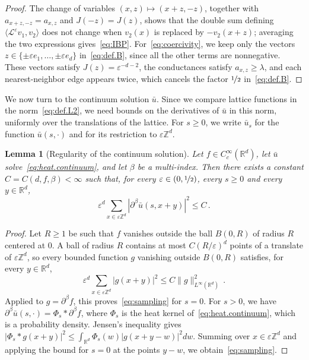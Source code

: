 \documentclass[11pt]{amsart}
\newtheorem{lemma}[theorem]{Lemma}
\numberwithin{equation}{section}
\newcommand{\Z}{\mathbb{Z}}
\newcommand{\R}{\mathbb{R}}
\newcommand{\eps}{\varepsilon}
\newcommand{\Leps}{\mathcal{L}^\varepsilon}
\newcommand{\nf}{\nicefrac}
\begin{document}
\begin{proof}
The change of variables $(x, z) \mapsto (x + z, -z)$, together with $a_{x + z, -z} = a_{x,z}$ and $J(-z) = J(z)$, shows that the double sum defining $\langle \Leps v_1, v_2 \rangle$ does not change when $v_2(x)$ is replaced by $-v_2(x+z)$; averaging the two expressions gives~\eqref{eq:IBP}.
For~\eqref{eq:coercivity}, we keep only the vectors $z \in \{\pm \eps e_1, \ldots, \pm \eps e_d\}$ in~\eqref{eq:def.B}, since all the other terms are nonnegative.
These vectors satisfy $J(z) = \eps^{-d-2}$, the conductances satisfy $a_{x,z} \geq \lambda$, and each nearest-neighbor edge appears twice, which cancels the factor $\nf12$ in~\eqref{eq:def.B}.
\end{proof}

We now turn to the continuum solution $\bar u$.
Since we compare lattice functions in the norm~\eqref{eq:def.L2}, we need bounds on the derivatives of $\bar u$ in this norm, uniformly over the translations of the lattice.
For $s \geq 0$, we write $\bar u_s$ for the function $\bar u(s, \cdot)$ and for its restriction to $\eps \Z^d$.

\begin{lemma}[Regularity of the continuum solution] \label{lem:sampling}
Let $f \in C^\infty_c(\R^d)$, let $\bar u$ solve~\eqref{eq:heat.continuum}, and let $\beta$ be a multi-index.
Then there exists a constant $C = C(d, f, \beta) < \infty$ such that, for every $\eps \in (0, \nf12)$, every $s \geq 0$ and every $y \in \R^d$,
\begin{equation} \label{eq:sampling}
    \eps^d \sum_{x \in \eps \Z^d} |\partial^\beta \bar u(s, x + y)|^2 \leq C\,.
\end{equation}
\end{lemma}

\begin{proof}
Let $R \geq 1$ be such that $f$ vanishes outside the ball $B(0,R)$ of radius $R$ centered at $0$.
A ball of radius $R$ contains at most $C(R/\eps)^d$ points of a translate of $\eps \Z^d$, so every bounded function $g$ vanishing outside $B(0,R)$ satisfies, for every $y \in \R^d$,
\begin{equation*}
    \eps^d \sum_{x \in \eps \Z^d} |g(x + y)|^2 \leq C \|g\|_{L^\infty(\R^d)}^2\,.
\end{equation*}
Applied to $g = \partial^\beta f$, this proves~\eqref{eq:sampling} for $s = 0$.
For $s > 0$, we have $\partial^\beta \bar u(s, \cdot) = \Phi_s * \partial^\beta f$, where $\Phi_s$ is the heat kernel of~\eqref{eq:heat.continuum}, which is a probability density.
Jensen's inequality gives $|\Phi_s * g(x + y)|^2 \leq \int_{\R^d} \Phi_s(w) |g(x + y - w)|^2 dw$.
Summing over $x \in \eps \Z^d$ and applying the bound for $s = 0$ at the points $y - w$, we obtain~\eqref{eq:sampling}.
\end{proof}
\end{document}
